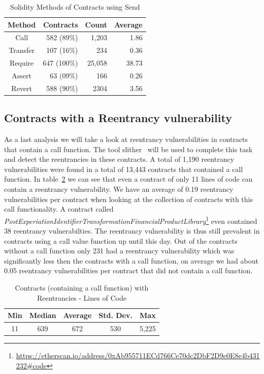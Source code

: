 \documentclass[10pt,conference]{IEEEtran}
\begin{document}
\begin{table}
\center
  \caption{Solidity Methods of Contracts using Send}
  \label{tab:send}
  \begin{tabular}{crrr}
    \hline
    Method & Contracts & Count & Average \\
    \hline
    Call& 582 (89\%) & 1,203 & 1.86\\
    Transfer& 107 (16\%) & 234 & 0.36\\
    Require& 647 (100\%) & 25,058 & 38.73\\
    Assert& 63 (09\%) & 166 & 0.26\\
    Revert& 588 (90\%) & 2304 & 3.56\\
    \hline
\end{tabular}
\end{table}

\subsection{Contracts with a Reentrancy vulnerability}

As a last analysis we will take a look at reentrancy vulnerabilities in contracts that contain a call function. The tool slither~\cite{slither} will be used to complete this task and detect the reentrancies in these contracts.
A total of 1,190 reentrancy vulnerabilities were found in a total of 13,443 contracts that contained a call function. In table~\ref{tab:re-loc} we can see that even a contract of only 11 lines of code can contain a reentrancy vulnerability. We have an average of 0.19 reentrancy vulnerabilities per contract when looking at the collection of contracts with this call functionality. A contract called 
 \textit{PostExperiationIdentifierTransformationFinancialProductLibrary}\footnote{\url{https://etherscan.io/address/0xAb955711ECd766Ce70dc2DbF2D9e0E8e4b431232\#code}} even contained 38 reentrancy vulnerabilties. The reentrancy vulnerability is thus still prevalent in contracts using a call value function up until this day. Out of the contracts without a call function only 231 had a reentrancy vulnerability which was significantly less then the contracts with a call function, on average we had about 0.05 reentrancy vulnerabilities per contract that did not contain a call function. 
\begin{table}
\center
  \caption{Contracts (containing a call function) with Reentrancies - Lines of Code}
  \label{tab:re-loc}
  \begin{tabular}{c c c c c}
    \hline
    Min & Median & Average & Std. Dev. & Max \\
    \hline
   11 & 639 & 672 & 530 & 5,225 \\
  \hline
\end{tabular}
\end{table}
\end{document}
